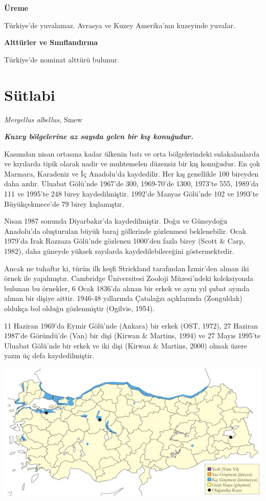 \documentclass[
  a4paper,
  DIV=11,
  numbers=noendperiod]{scrreprt}
\begin{document}
\textbf{Üreme}

Türkiye'de yuvalamaz. Avrasya ve Kuzey Amerika'nın kuzeyinde yuvalar.

\textbf{Alttürler ve Sınıflandırma}

Türkiye'de nominat alttürü bulunur.

\section{Sütlabi}\label{suxfctlabi}

\emph{Mergellus albellus,} Smew

\textbf{\emph{Kuzey bölgelerine az sayıda gelen bir kış konuğudur.}}

Kasımdan nisan ortasına kadar ülkenin batı ve orta bölgelerindeki
sulakalanlarda ve kıyılarda tipik olarak nadir ve muhtemelen düzensiz
bir kış konuğudur. En çok Marmara, Karadeniz ve İç Anadolu'da
kaydedilir. Her kış genellikle 100 bireyden daha azdır. Uluabat Gölü'nde
1967'de 300, 1969-70'de 1300, 1973'te 555, 1989'da 111 ve 1995'te 248
birey kaydedilmiştir. 1992'de Manyas Gölü'nde 102 ve 1993'te
Büyükçekmece'de 79 birey kışlamıştır.

Nisan 1987 sonunda Diyarbakır'da kaydedilmiştir. Doğu ve Güneydoğu
Anadolu'da oluşturulan büyük baraj göllerinde gözlenmesi beklenebilir.
Ocak 1979'da Irak Razzaza Gölü'nde gözlenen 1000'den fazla birey (Scott
\& Carp, 1982), daha güneyde yüksek sayılarda kaydedilebileceğini
göstermektedir.

Ancak ne tuhaftır ki, türün ilk keşfi Strickland tarafından İzmir'den
alınan iki örnek ile yapılmıştır. Cambridge Üniversitesi Zooloji
Müzesi'ndeki koleksiyonda bulunan bu örnekler, 6 Ocak 1836'da alınan bir
erkek ve aynı yıl şubat ayında alınan bir dişiye aittir. 1946-48
yıllarında Çatalağzı açıklarında (Zonguldak) oldukça bol olduğu
gözlenmiştir (Ogilvie, 1954).

11 Haziran 1969'da Eymir Gölü'nde (Ankara) bir erkek (OST, 1972), 27
Haziran 1987'de Göründü'de (Van) bir dişi (Kirwan \& Martins, 1994) ve
27 Mayıs 1995'te Uluabat Gölü'nde bir erkek ve iki dişi (Kirwan \&
Martins, 2000) olmak üzere yazın üç defa kaydedilmiştir.

\includegraphics{images/harita_Page_032.png}
\end{document}
